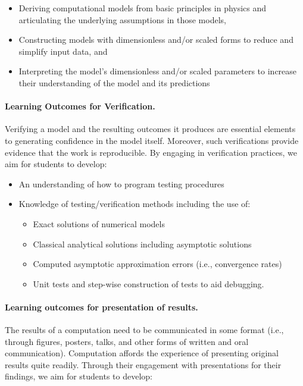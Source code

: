 \documentclass[graybox,envcountchap,sectrefs]{svmult}
\begin{document}
\begin{itemize}
\item Deriving computational models from basic principles in physics and articulating the underlying assumptions in those models,

\item Constructing models with dimensionless and/or scaled forms to reduce and simplify input data, and

\item Interpreting the model's dimensionless and/or scaled parameters to increase their understanding of the model and its predictions
\end{itemize}

\noindent
\paragraph{Learning Outcomes for Verification.}
Verifying a model and the resulting outcomes it produces are essential elements to generating confidence in the model itself. Moreover, such verifications provide evidence that the work is reproducible. By engaging in verification practices, we aim for students to develop:

\begin{itemize}
\item An understanding of how to program testing procedures

\item Knowledge of testing/verification methods including the use of:
\begin{itemize}

  \item Exact solutions of numerical models

  \item Classical analytical solutions including asymptotic solutions

  \item Computed asymptotic approximation errors (i.e., convergence rates)

  \item Unit tests and step-wise construction of tests to aid debugging.
\end{itemize}

\noindent
\end{itemize}

\noindent
\paragraph{Learning outcomes for presentation of results.}
The results of a computation need to be communicated in some format (i.e., through figures, posters, talks, and other forms of written and oral communication). Computation affords the experience of presenting original results quite readily. Through their engagement with presentations for their findings, we aim for students to develop:
\end{document}

